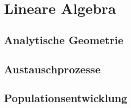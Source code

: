 \renewcommand{\subdir}{LineareAlgebra/}

\ifproblem
\section{Lineare Algebra}
\fi


\ifproblem
\subsection{Analytische Geometrie}
\fi







\ifproblem
\subsection{Austauschprozesse}
\fi







\ifproblem
\subsection{Populationsentwicklung}
\fi


